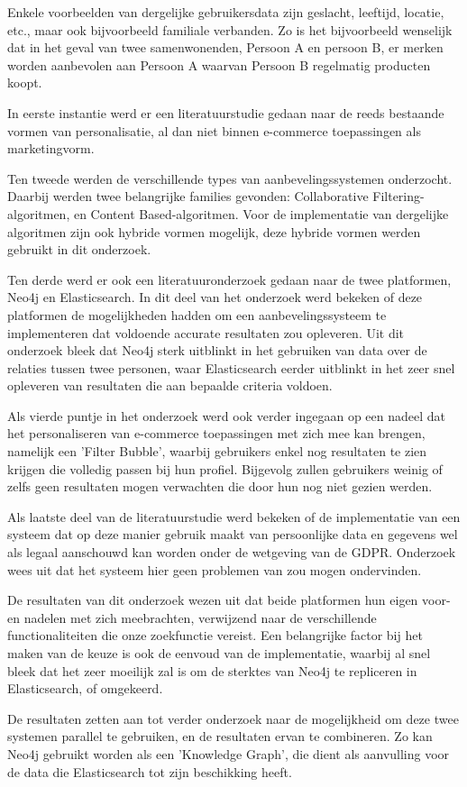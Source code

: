Enkele voorbeelden van dergelijke gebruikersdata zijn geslacht, leeftijd, locatie, etc., maar ook bijvoorbeeld familiale verbanden. Zo is het bijvoorbeeld wenselijk dat in het geval van twee samenwonenden, Persoon A en persoon B, er merken worden aanbevolen aan Persoon A waarvan Persoon B regelmatig producten koopt.

In eerste instantie werd er een literatuurstudie gedaan naar de reeds bestaande vormen van personalisatie, al dan niet binnen e-commerce toepassingen als marketingvorm.

Ten tweede werden de verschillende types van aanbevelingssystemen onderzocht. Daarbij werden twee belangrijke families gevonden: Collaborative Filtering-algoritmen, en Content Based-algoritmen. Voor de implementatie van dergelijke algoritmen zijn ook hybride vormen mogelijk, deze hybride vormen werden gebruikt in dit onderzoek.

Ten derde werd er ook een literatuuronderzoek gedaan naar de twee platformen, Neo4j en Elasticsearch. In dit deel van het onderzoek werd bekeken of deze platformen de mogelijkheden hadden om een aanbevelingssysteem te implementeren dat voldoende accurate resultaten zou opleveren. Uit dit onderzoek bleek dat Neo4j sterk uitblinkt in het gebruiken van data over de relaties tussen twee personen, waar Elasticsearch eerder uitblinkt in het zeer snel opleveren van resultaten die aan bepaalde criteria voldoen.

Als vierde puntje in het onderzoek werd ook verder ingegaan op een nadeel dat het personaliseren van e-commerce toepassingen met zich mee kan brengen, namelijk een 'Filter Bubble', waarbij gebruikers enkel nog resultaten te zien krijgen die volledig passen bij hun profiel. Bijgevolg zullen gebruikers weinig of zelfs geen resultaten mogen verwachten die door hun nog niet gezien werden.

Als laatste deel van de literatuurstudie werd bekeken of de implementatie van een systeem dat op deze manier gebruik maakt van persoonlijke data en gegevens wel als legaal aanschouwd kan worden onder de wetgeving van de GDPR. Onderzoek wees uit dat het systeem hier geen problemen van zou mogen ondervinden.

De resultaten van dit onderzoek wezen uit dat beide platformen hun eigen voor- en nadelen met zich meebrachten, verwijzend naar de verschillende functionaliteiten die onze zoekfunctie vereist. Een belangrijke factor bij het maken van de keuze is ook de eenvoud van de implementatie, waarbij al snel bleek dat het zeer moeilijk zal is om de sterktes van Neo4j te repliceren in Elasticsearch, of omgekeerd.

De resultaten zetten aan tot verder onderzoek naar de mogelijkheid om deze twee systemen parallel te gebruiken, en de resultaten ervan te combineren.  Zo kan Neo4j gebruikt worden als een 'Knowledge Graph', die dient als aanvulling voor de data die Elasticsearch tot zijn beschikking heeft. 


